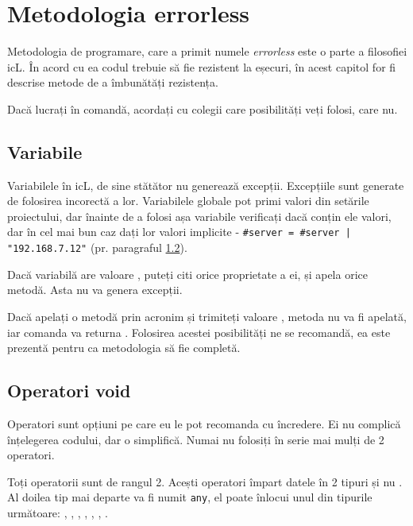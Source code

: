 
\section{Metodologia errorless}

\label{errorless-sec}

Metodologia de programare, care a primit numele \textit{errorless} este o parte a filosofiei icL. În acord cu ea codul trebuie să fie rezistent la eșecuri, în acest capitol for fi descrise metode de a îmbunătăți rezistența.

Dacă lucrați în comandă, acordați cu colegii care posibilități veți folosi, care nu.

\subsection{Variabile}

Variabilele în icL, de sine stătător nu generează excepții. Excepțiile sunt generate de folosirea incorectă a lor. Variabilele globale pot primi valori din setările proiectului, dar înainte de a folosi așa variabile verificați dacă conțin ele valori, dar în cel mai bun caz dați lor valori implicite - \texttt{#server = #server | "192.168.7.12"} (pr. paragraful \ref{void-operators}).

Dacă variabilă are valoare \void, puteți citi orice proprietate a ei, și apela orice metodă. Asta nu va genera excepții.

Dacă apelați o metodă prin acronim și trimiteți valoare \void, metoda nu va fi apelată, iar comanda va returna \void. Folosirea acestei posibilități ne se recomandă, ea este prezentă pentru ca metodologia să fie completă.

\subsection{Operatori void}

\label{void-operators}

Operatori \void{} sunt opțiuni pe care eu le pot recomanda cu încredere. Ei nu complică înțelegerea codului, dar o simplifică. Numai nu folosiți în serie mai mulți de 2 operatori.

Toți operatorii \void{} sunt de rangul 2. Acești operatori împart datele în 2 tipuri \void{} și nu \void{}. Al doilea tip mai departe va fi numit \texttt{any}, el poate înlocui unul din tipurile următoare: \integer{}, \double{}, \str{}, \listtype{}, \object{}, \set{}, \element{}.

